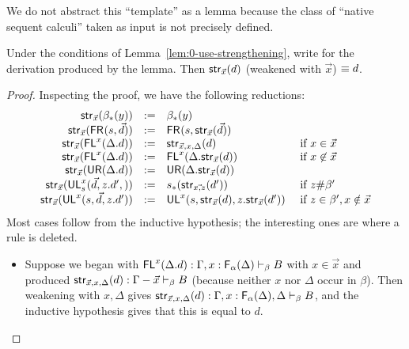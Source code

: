 We do not abstract this ``template'' as a lemma because the class of
``native sequent calculi'' taken as input is not precisely
defined.  

\begin{lemma} \label{lem:0-use-strengthening-eq}
Under the conditions of Lemma~\ref{lem:0-use-strengthening}, write
 for the derivation produced by the lemma.  Then
$\mathsf{str}_{\vec{x}}(d)$ (weakened with $\vec{x}$) $\equiv d$.  
\end{lemma}
\begin{proof}
Inspecting the proof, we have the following reductions:
\[
\begin{array}{rcll}
\mathsf{str}_{\vec{x}}(\beta_*(y)) & := & {\beta_*(y)}\\
\mathsf{str}_{\vec{x}}(\mathsf{FR}_{}(s,\vec{d})) & := & \mathsf{FR}_{}(s,\mathsf{str}_{\vec{x}}(\vec{d}))\\
\mathsf{str}_{\vec{x}}(\mathsf{FL}^{x}(\Delta.d)) & := & \mathsf{str}_{\vec{x},x,\Delta}(d) & \text{ if } x \in \vec{x}\\
\mathsf{str}_{\vec{x}}(\mathsf{FL}^{x}(\Delta.d)) & := & \mathsf{FL}^{x}(\Delta.\mathsf{str}_{\vec{x}}(d)) & \text{ if } x \not\in \vec{x}\\
\mathsf{str}_{\vec{x}}(\mathsf{UR}(\Delta.d)) & := & \mathsf{UR}(\Delta.\mathsf{str}_{\vec{x}}(d))\\
\mathsf{str}_{\vec{x}}(\mathsf{UL}^{x}_{s}(\vec{d},z.d',)) & := & s_*(\mathsf{str}_{\vec{x,z}}(d')) & \text{ if } z \# \beta'\\
\mathsf{str}_{\vec{x}}(\mathsf{UL}^{x}_{}(s,\vec{d},z.d')) & := & \mathsf{UL}^{x}_{}(s,\mathsf{str}_{\vec{x}}(d),z.\mathsf{str}_{\vec{x}}(d')) & \text{ if } z \in \beta', x \notin \vec{x}\\
\end{array}
\]
Most cases follow from the inductive hypothesis; the interesting ones
are where a rule is deleted.  

\begin{itemize}

\item Suppose we began with $\mathsf{FL}^{x}(\Delta.d) :
  \Gamma,x:\mathsf{F}_{\alpha}(\Delta) \vdash_{\beta} B$ with $x \in \vec{x}$ and
  produced $\mathsf{str}_{\vec{x},x,\Delta}(d) : \Gamma-\vec{x} \vdash_{\beta} B$
  (because neither $x$ nor $\Delta$ occur in $\beta$).  Then weakening
  with $x,\Delta$ gives $\mathsf{str}_{\vec{x},x,\Delta}(d) :
  \Gamma,x:\mathsf{F}_{\alpha}(\Delta),\Delta \vdash_{\beta} B$, and the inductive
  hypothesis gives that this is equal to $d$.  


\end{itemize}
\end{proof}
